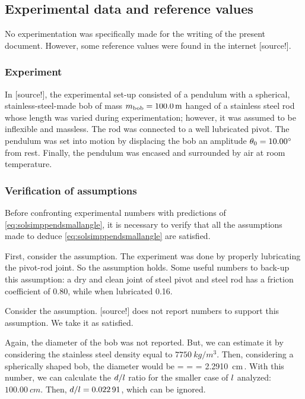 \subsection{Experimental data and reference values}
No experimentation was specifically made for the writing of the present document. However, some reference values were found in the internet [source!]. 


\subsubsection{Experiment}\label{sec:experiment}
In [source!], the experimental set-up consisted of a pendulum with a spherical, stainless-steel-made bob of mass $m_\text{bob} = \SI{100.0}{m}$ hanged of a stainless steel rod whose length was varied during experimentation; however, it was assumed to be inflexible and massless. The rod was connected to a well lubricated pivot. The pendulum was set into motion by displacing the bob an amplitude $\theta_0 = \ang{10.00}$ from rest. Finally, the pendulum was encased and surrounded by air at room temperature.


\subsubsection{Verification of assumptions}
Before confronting experimental numbers with predictions of \cref{eq:solsimppendsmallangle}, it is necessary to verify that all the assumptions made to deduce \cref{eq:solsimppendsmallangle} are satisfied.

First, consider the  assumption. The experiment was done by properly lubricating the pivot-rod joint. So the assumption holds. Some useful numbers to back-up this assumption: a dry and clean joint of steel pivot and steel rod has a friction coefficient of 0.80, while when lubricated 0.16.

Consider the  assumption. [source!] does not report numbers to support this assumption. We take it as satisfied.

Again, the diameter of the bob was not reported. But, we can estimate it by considering the stainless steel density equal to $\SI{7750}{kg/m^3}$. Then, considering a spherically shaped bob, the diameter would be
\beq
\diam = 
      = 
      = \SI{2.2910}{cm}\,.
\eeq
With this number, we can calculate the $d/l$ ratio for the smaller case of $l$ analyzed: $\SI{100.00}{cm}$. Then, $d/l = \num{0.02291}$, which can be ignored.

